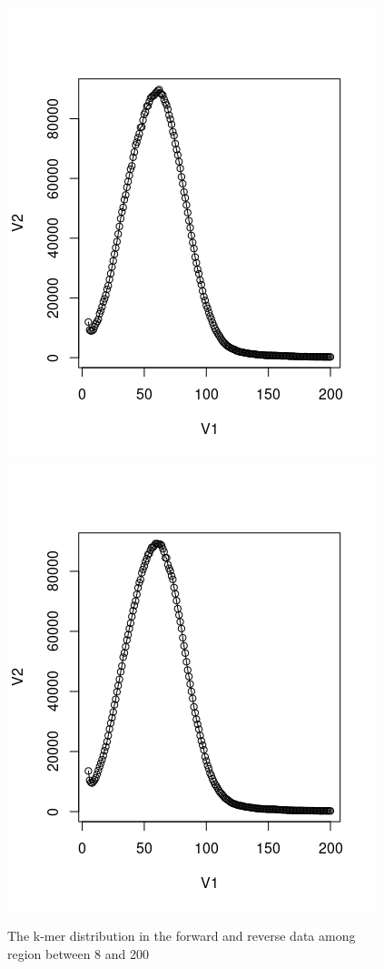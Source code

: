 \documentclass{article}
\begin{document}
\begin{figure}[h]
	\centering
\includegraphics[scale=0.5 ]{peak1} 
\includegraphics[scale=0.5 ]{peak2} \\
 
\centering \caption{The k-mer distribution in the forward and reverse data among region between 8 and 200}
\label{saw}
\end{figure}
 
\end{document}
